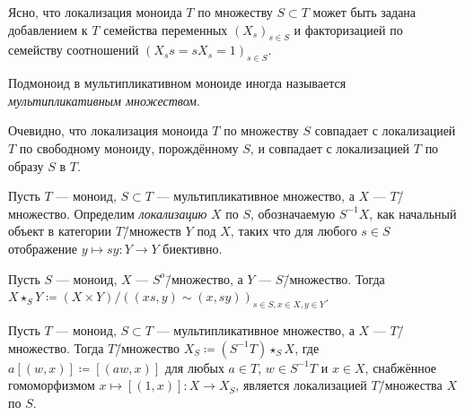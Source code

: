 \documentclass[
	extrafontsizes,
	11pt,
	hyphens,
]{memoir}
\begin{document}
\begin{observation}
Ясно, что локализация моноида \(T\) по множеству \(S \subset T\) может быть задана
добавлением к \(T\) семейства переменных \((X_s)_{s \in S}\) и факторизацией по семейству соотношений
\((X_s s = s X_s = 1)_{s \in S}\).
\end{observation}


\begin{definition}
Подмоноид в мультипликативном моноиде иногда называется \emph{мультипликативным мно\-жес\-твом}.
\end{definition}

\begin{observation}
Очевидно, что локализация моноида \(T\) по множеству \(S\) совпадает с локализацией \(T\) по свободному моноиду, порождённому \(S\),
и совпадает с локализацией \(T\) по образу \(S\) в \(T\).
\end{observation}

\begin{definition}
Пусть \(T\) --- моноид, \(S \subset T\) --- мультипликативное множество, а \(X\) --- \(T\)\=/множество.
Определим \emph{локализацию} \(X\) по \(S\), обозначаемую \(S^{-1}X\), как начальный объект в категории \(T\)\=/множеств \(Y\) под \(X\), таких что для любого \(s \in S\) отображение \(y \mapsto sy : Y \to Y\) биективно.
\end{definition}

\begin{notation}
Пусть \(S\) --- моноид, \(X\) --- \(S^o\)\=/множество, а \(Y\) --- \(S\)\=/множество.
Тогда
\(X \star_S Y \coloneqq (X \times Y) / ((xs,y) \sim (x,sy))_{s \in S, x \in X, y \in Y}\).
\end{notation}

\begin{observation}
Пусть \(T\) --- моноид, \(S \subset T\) --- мультипликативное множество, а \(X\) --- \(T\)\=/множество.%
\label{obs:LocMonAndLocSet}
Тогда \(T\)\=/множество
\(X_S \coloneqq (S^{-1}T) \star_S X\),
где \(a[(w,x)] \coloneqq [(aw,x)]\) для любых \(a \in T\), \(w \in S^{-1}T\) и \(x \in X\), снабжённое гомоморфизмом \(x \mapsto [(1,x)] : X \to X_S\),
является локализацией \(T\)\=/множества \(X\) по \(S\).
\end{observation}
\end{document}

